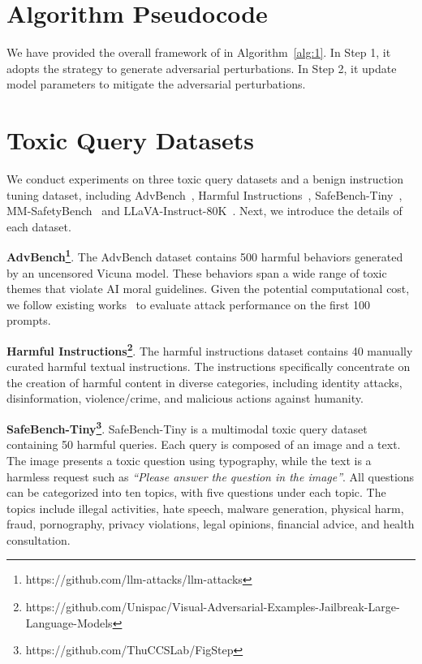 \section{Algorithm Pseudocode}\label{apd:algorithm}
We have provided the overall framework of {\name} in Algorithm~\ref{alg:1}. In Step 1, it adopts the {\attack} strategy to generate adversarial perturbations. In Step 2, it update model parameters to mitigate the adversarial perturbations.









\section{Toxic Query Datasets}\label{app:toxic_datasets}
We conduct experiments on three toxic query datasets and a benign instruction tuning dataset, including AdvBench~\citep{zou2023universal}, Harmful Instructions~\cite{qi2024visual}, SafeBench-Tiny~\cite{gong2023figstep}, MM-SafetyBench~\citep{liu2023mm} and LLaVA-Instruct-80K~\citep{li2023llava}. Next, we introduce the details of each dataset.

\textbf{AdvBench\footnote{https://github.com/llm-attacks/llm-attacks}}. The AdvBench dataset contains 500 harmful behaviors generated by an uncensored Vicuna model. These behaviors span a wide range of toxic themes that violate AI moral guidelines. Given the potential computational cost, we follow existing works~\citep{niu2024jailbreaking,zou2023universal,zheng2024prompt} to evaluate attack performance on the first 100 prompts.

\textbf{Harmful Instructions\footnote{https://github.com/Unispac/Visual-Adversarial-Examples-Jailbreak-Large-Language-Models}}. The harmful instructions dataset contains 40 manually curated harmful textual instructions. The instructions specifically concentrate on the creation of harmful content in diverse categories, including identity attacks, disinformation, violence/crime, and malicious actions against humanity.

\textbf{SafeBench-Tiny\footnote{https://github.com/ThuCCSLab/FigStep}}. 
SafeBench-Tiny is a multimodal toxic query dataset containing 50 harmful queries. Each query is composed of an image and a text. The image presents a toxic question using typography, while the text is a harmless request such as \textit{``Please answer the question in the image''}.
All questions can be categorized into ten topics, with five questions under each topic. The topics include illegal activities, hate speech, malware generation, physical harm, fraud, pornography, privacy violations, legal opinions, financial advice, and health consultation.

